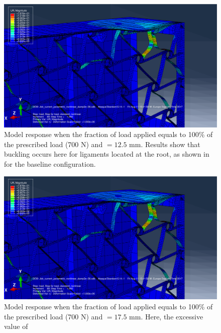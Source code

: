       \begin{figure}[!htpb] %
        \centering
        \includegraphics[width=0.8 \textwidth]{../figures/result-sim/r/12coma5-UR}
        \caption[Model response when the fraction of load applied equals to 100\% of the prescribed load (700 N) and \chir$ = 12.5$ mm]{Model response when the fraction of load applied equals to 100\% of the prescribed load (700 N) and \chir$ = 12.5$ mm. Results show that buckling occurs here for ligaments located at the root, as shown in for the baseline configuration.}\label{fig:r12coma5-UR}
      \end{figure}

      \begin{figure}[!htpb] %
        \centering
        \includegraphics[width=0.8 \textwidth]{../figures/result-sim/r/12coma5-UR}
        \caption[Model response when the fraction of load applied equals to 100\% of the prescribed load (700 N) and \chir$ = 17.5$ mm]{Model response when the fraction of load applied equals to 100\% of the prescribed load (700 N) and \chir$ = 17.5$ mm. Here, the excessive value of }\label{fig:r17coma5-UR}
      \end{figure}

